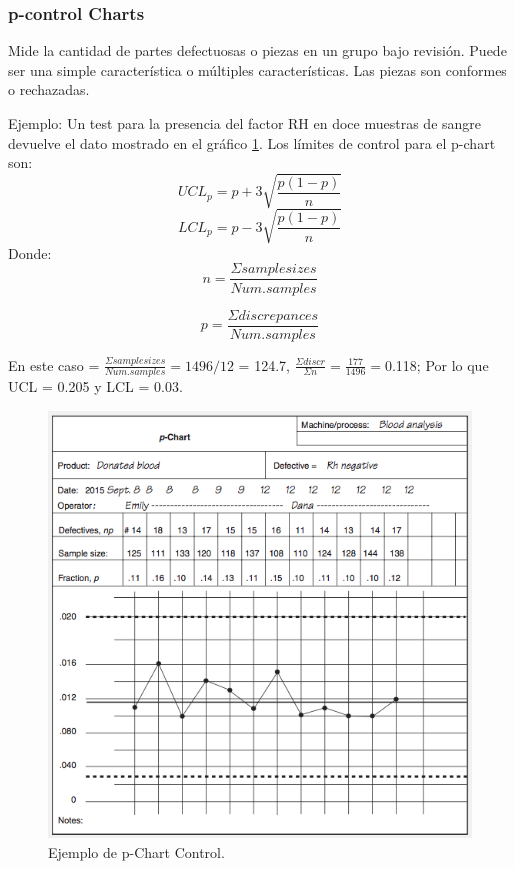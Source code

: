 \documentclass[]{article}
\begin{document}
\subsubsection{p-control Charts}
Mide la cantidad de partes defectuosas o piezas en un grupo bajo revisión. Puede ser una simple característica o múltiples características. 
Las piezas son conformes o rechazadas. 

Ejemplo: Un test para la presencia del factor RH en doce muestras de sangre devuelve el dato mostrado en el gráfico \ref{fig:pChartEjemplo}.
Los límites de control para el p-chart son:
\begin{equation}
UCL_p = p + 3 \sqrt{\frac{p(1-p)}{n}}
\end{equation}
\begin{equation}
LCL_p = p - 3 \sqrt{\frac{p(1-p)}{n}}
\end{equation}
Donde:
\begin{equation}
n = \frac{\Sigma sample sizes}{Num. samples}
\end{equation}

\begin{equation}
p = \frac{\Sigma discrepances}{Num. samples}
\end{equation}

En este caso = $\frac{\Sigma sample sizes}{Num. samples} = 1496 / 12$ = 124.7, $\frac{\Sigma discr}{\Sigma n} = \frac{177}{1496} = $0.118;
Por lo que UCL = 0.205 y LCL = 0.03.

\begin{figure}[H]
	\centering
	\includegraphics[width=120mm]{imagenes/pChartEjemplo.png}
	\caption{Ejemplo de p-Chart Control.}
	\label{fig:pChartEjemplo}
\end{figure}
\end{document}
